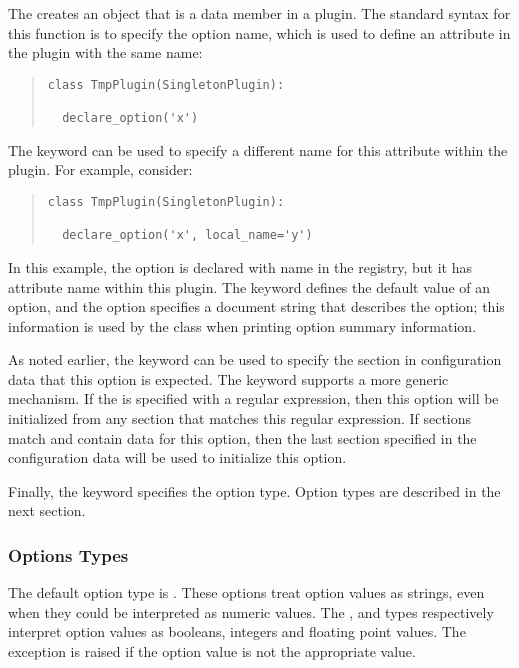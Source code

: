 The  creates an  object that is a data member in a 
plugin.  The standard syntax for this function is to specify the option name, which is used to define an attribute in the plugin with the same name:
\begin{quotation}
\begin{lstlisting}
class TmpPlugin(SingletonPlugin):

  declare_option('x')
\end{lstlisting}
\end{quotation}
The  keyword can be used to specify a different name for this attribute
within the plugin.  For example, consider:
\begin{quotation}
\begin{lstlisting}
class TmpPlugin(SingletonPlugin):

  declare_option('x', local_name='y')
\end{lstlisting}
\end{quotation}
In this example, the option is declared with name  in the \pcasp
registry, but it has attribute name  within this plugin.  
The 
keyword defines the default value of an option, and the  option specifies a
document string that describes the option;  this information is used by the  class when printing option summary information.

As noted earlier, the  keyword can be used to specify
the section in configuration data that this option is expected.
The  keyword supports a more generic mechanism.
If the  is specified with a regular expression,
then this option will be initialized from any section that matches this
regular expression.  If sections match and contain data for this option,
then the last section specified in the configuration data will be used
to initialize this option.

Finally, the  keyword specifies the option type.  Option types are described in 
the next section.



\subsubsection{Options Types}

The default option type is .  These options treat option values as strings, 
even when they could be interpreted as numeric values.  The ,  and  types respectively interpret option values as booleans, integers and floating point values.  The  exception is raised if the option value is not the appropriate value.

